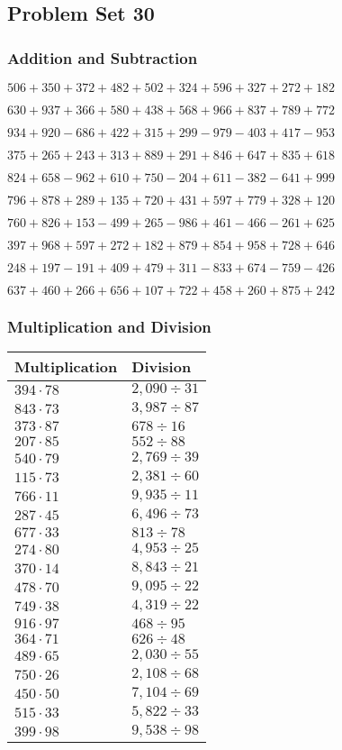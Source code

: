 \hypertarget{problem-set-30-2}{%
\subsection{Problem Set 30}\label{problem-set-30-2}}

\hypertarget{addition-and-subtraction-130}{%
\subsubsection{Addition and
Subtraction}\label{addition-and-subtraction-130}}

\(506 + 350 + 372 + 482 + 502 + 324 + 596 + 327 + 272 + 182\)

\(630 + 937 + 366 + 580 + 438 + 568 + 966 + 837 + 789 + 772\)

\(934 + 920 - 686 + 422 + 315 + 299 - 979 - 403 + 417 - 953\)

\(375 + 265 + 243 + 313 + 889 + 291 + 846 + 647 + 835 + 618\)

\(824 + 658 - 962 + 610 + 750 - 204 + 611 - 382 - 641 + 999\)

\(796 + 878 + 289 + 135 + 720 + 431 + 597 + 779 + 328 + 120\)

\(760 + 826 + 153 - 499 + 265 - 986 + 461 - 466 - 261 + 625\)

\(397 + 968 + 597 + 272 + 182 + 879 + 854 + 958 + 728 + 646\)

\(248 + 197 - 191 + 409 + 479 + 311 - 833 + 674 - 759 - 426\)

\(637 + 460 + 266 + 656 + 107 + 722 + 458 + 260 + 875 + 242\)

\hypertarget{multiplication-and-division-130}{%
\subsubsection{Multiplication and
Division}\label{multiplication-and-division-130}}

\begin{longtable}[]{@{}ll@{}}
\toprule
Multiplication & Division\tabularnewline
\midrule
\endhead
\(394 \cdot 78\) & \(2,090÷31\)\tabularnewline
\(843 \cdot 73\) & \(3,987÷87\)\tabularnewline
\(373 \cdot 87\) & \(678÷16\)\tabularnewline
\(207 \cdot 85\) & \(552÷88\)\tabularnewline
\(540 \cdot 79\) & \(2,769÷39\)\tabularnewline
\(115 \cdot 73\) & \(2,381÷60\)\tabularnewline
\(766 \cdot 11\) & \(9,935÷11\)\tabularnewline
\(287 \cdot 45\) & \(6,496÷73\)\tabularnewline
\(677 \cdot 33\) & \(813÷78\)\tabularnewline
\(274 \cdot 80\) & \(4,953÷25\)\tabularnewline
\(370 \cdot 14\) & \(8,843÷21\)\tabularnewline
\(478 \cdot 70\) & \(9,095÷22\)\tabularnewline
\(749 \cdot 38\) & \(4,319÷22\)\tabularnewline
\(916 \cdot 97\) & \(468÷95\)\tabularnewline
\(364 \cdot 71\) & \(626÷48\)\tabularnewline
\(489 \cdot 65\) & \(2,030÷55\)\tabularnewline
\(750 \cdot 26\) & \(2,108÷68\)\tabularnewline
\(450 \cdot 50\) & \(7,104÷69\)\tabularnewline
\(515 \cdot 33\) & \(5,822÷33\)\tabularnewline
\(399 \cdot 98\) & \(9,538÷98\)\tabularnewline
\bottomrule
\end{longtable}

